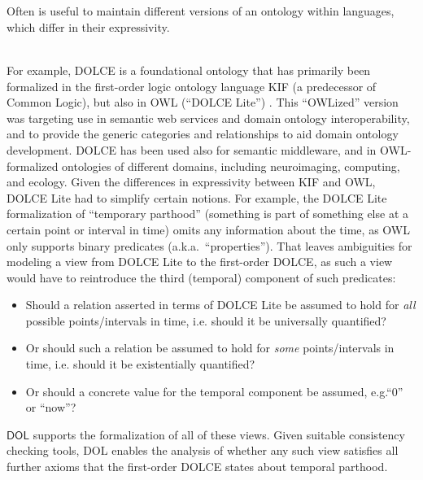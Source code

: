 \documentclass[10pt, a4paper]{isov2}
\makeatletter
\newcommand{\bcnew}[1]{~\\{\color{red}\large \hrulefill \href{http://issues.omg.org/browse/DOL-#1}{\normalfont{JIRA DOL-{}#1}} \hrulefill\\}  }
\newcommand{\ecnew}[0]{~\\{{\color{red}\large \hrulefill {\normalfont{end}} \hrulefill\\}  }}
\newcommand*{\eg}{e.g.\@\xspace}
\newcommand*{\ie}{i.e.\@\xspace}
\newcommand*{\DOL}{\ensuremath{\mathsf{DOL}}\xspace}
\providecommand{\DIFaddtex}[1]{{\protect\color{blue}\uwave{#1}}} %
\providecommand{\DIFaddbegin}{} %
\providecommand{\DIFaddend}{} %
\providecommand{\DIFadd}[1]{\texorpdfstring{\DIFaddtex{#1}}{#1}} %
\makeatother
\begin{document}
\bcnew{37}
Often \DIFaddbegin \DIFadd{it }\DIFaddend is useful to maintain different versions of an ontology within languages, which differ in 
 their expressivity. 
\ecnew
 
For example,  DOLCE is a foundational ontology that has primarily been formalized in
 the first-order logic 
ontology language KIF (a predecessor of Common Logic), but also in OWL (``DOLCE Lite'') 
\cite{dolce}. This ``OWLized'' version was targeting use in semantic web services and domain 
ontology interoperability, and to provide the generic categories and relationships to aid 
 domain ontology development. DOLCE has been used also for semantic middleware, and in 
OWL-formalized ontologies of different domains, including neuroimaging, computing, and ecology.
  Given the differences in expressivity between KIF and OWL, DOLCE Lite 
   had to simplify certain notions.  For example, 
 the DOLCE Lite formalization of ``temporary parthood'' (something is part of something else at a 
certain point or interval in time) omits any information about the time, as OWL only supports 
binary predicates (a.k.a.\ ``properties'').  That leaves ambiguities for modeling a view from
DOLCE Lite to the first-order DOLCE, as such a view would have to reintroduce the third (temporal) 
component of such predicates:
   \begin{itemize} 
  \item Should a relation asserted in terms of DOLCE Lite be assumed to hold for \emph{all} possible points/intervals in time, \ie should it be universally quantified?
  \item Or should such a relation be assumed to hold for \emph{some} points/intervals in time, \ie should it be existentially quantified?
  \item Or should a concrete value for the temporal component be assumed, \eg ``0'' or ``now''?
   \end{itemize} 
%  
\DOL supports the formalization of  all of these views. Given suitable consistency 
checking tools, DOL enables the analysis of  whether any such view satisfies all further
 axioms that the  first-order DOLCE states about temporal parthood.

\end{document}
